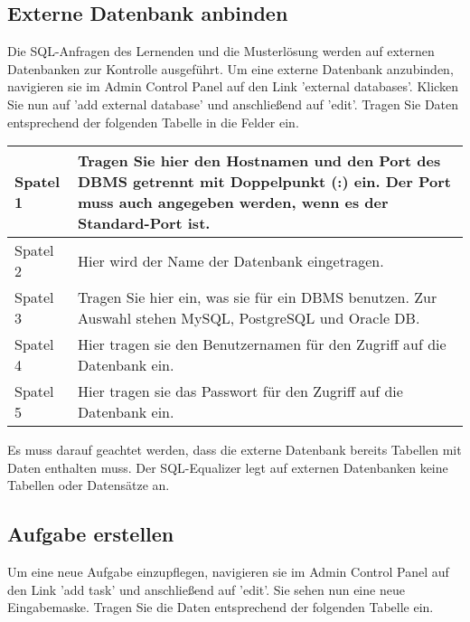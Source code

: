 \documentclass[12pt]{scrreprt}
\theoremstyle{remark}
\begin{document}
\subsection{Externe Datenbank anbinden}

Die SQL-Anfragen des Lernenden und die Musterlösung werden auf externen Datenbanken zur Kontrolle ausgeführt. Um eine externe Datenbank anzubinden, navigieren sie im Admin Control Panel auf den Link 'external databases'. Klicken Sie nun auf 'add external database' und anschließend auf 'edit'.  Tragen Sie Daten entsprechend der folgenden Tabelle in die Felder ein.

\begin{tabular}{|l|p{14cm}|}\hline
Spatel 1 & Tragen Sie hier den Hostnamen und den Port des DBMS getrennt mit Doppelpunkt (:) ein. Der Port muss auch angegeben werden, wenn es der Standard-Port ist.\\\hline
Spatel 2 & Hier wird der Name der Datenbank eingetragen.\\\hline
Spatel 3 & Tragen Sie hier ein, was sie für ein DBMS benutzen. Zur Auswahl stehen MySQL, PostgreSQL und Oracle DB.\\\hline
Spatel 4 & Hier tragen sie den Benutzernamen für den Zugriff auf die Datenbank ein.\\\hline
Spatel 5 & Hier tragen sie das Passwort für den Zugriff auf die Datenbank ein.\\\hline
\end{tabular}

Es muss darauf geachtet werden, dass die externe Datenbank bereits Tabellen mit Daten enthalten muss. Der SQL-Equalizer legt auf externen Datenbanken keine Tabellen oder Datensätze an.

\subsection{Aufgabe erstellen}

Um eine neue Aufgabe einzupflegen, navigieren sie im Admin Control Panel auf den Link 'add task' und anschließend auf 'edit'. Sie sehen nun eine neue Eingabemaske. Tragen Sie die Daten entsprechend der folgenden Tabelle ein.
\end{document}
